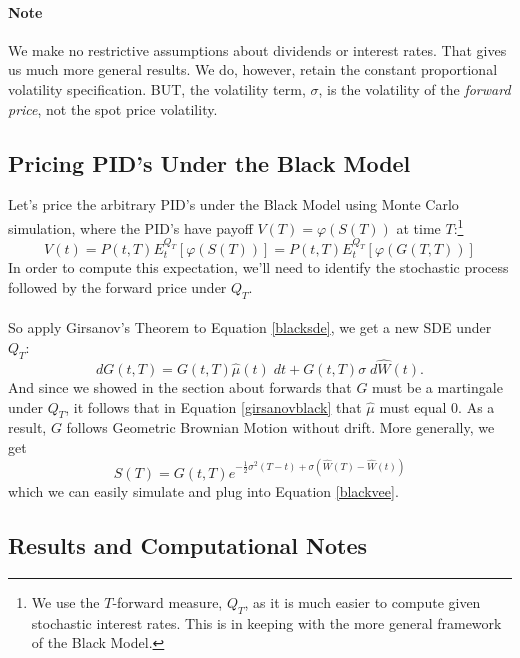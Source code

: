 \documentclass[12pt]{article}
\theoremstyle{plain}
\theoremstyle{definition}
\theoremstyle{remark}
\begin{document}
\paragraph{Note} We make no restrictive assumptions about dividends
or interest rates.  That gives us much more general results. We do,
however, retain the constant proportional volatility specification.
BUT, the volatility term, $\sigma$, is the volatility of the 
\emph{forward price}, not the spot price volatility.


\subsection{Pricing PID's Under the Black Model}

Let's price the arbitrary PID's under the Black Model using 
Monte Carlo simulation, where the PID's have payoff
$V(T) = \varphi(S(T))$ at time $T$:\footnote{We use the $T$-forward 
measure, $Q_T$, as it is much easier to compute given stochastic
interest rates. This is in keeping with the more general framework
of the Black Model.}
\begin{equation}
   \label{blackvee}
   V(t) = P(t,T) E_t^{Q_T}[\varphi(S(T))] = 
   P(t,T) E_t^{Q_T}[\varphi(G(T,T))]
\end{equation}
In order to compute this expectation, we'll need to identify the 
stochastic process followed by the forward price under $Q_T$.
\\
\\
So apply Girsanov's Theorem to Equation \ref{blacksde}, we get a new
SDE under $Q_T$:
\begin{equation}
   \label{girsanovblack}
   dG(t,T) = G(t,T) \hat{\mu}(t) \; dt + G(t,T) \sigma \; d\hat{W}(t).
\end{equation}
And since we showed in the section about forwards that $G$ must be
a martingale under $Q_T$, it follows that in Equation 
\ref{girsanovblack} that $\hat{\mu}$ must equal 0. As a result, $G$ 
follows Geometric Brownian Motion without drift. More generally, 
we get
\begin{equation}
   \label{blackgbm}
   S(T) = G(t,T) e^{-\frac{1}{2} \sigma^2 (T-t) 
      + \sigma (\hat{W}(T) - \hat{W}(t)) }
\end{equation}
which we can easily simulate and plug into Equation \ref{blackvee}.

\subsection{Results and Computational Notes}
\end{document}
